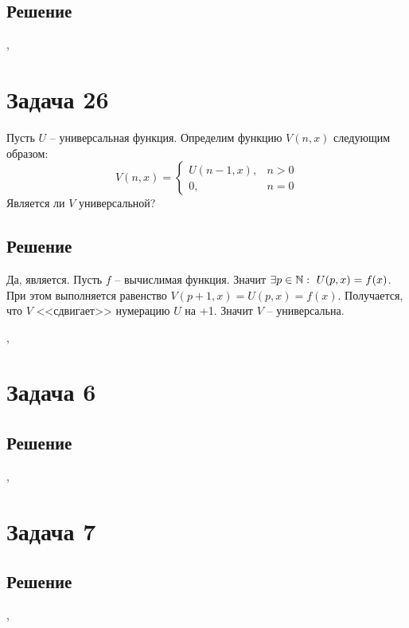 \documentclass[a4paper,12pt]{article}
\begin{document}
	\subsection*{Решение}


	\sep	
	
	\section*{Задача 26}
	Пусть $U$ -- универсальная функция. Определим функцию $V(n,x)$ следующим образом:
    \[
    V(n, x) = 
    \begin{cases}
        U(n - 1, x), & n > 0 \\
        0,           & n = 0
    \end{cases}
    \]
    Является ли $V$ универсальной?
    
	\subsection*{Решение}
	Да, является. Пусть $f$ -- вычислимая функция. Значит $\exists p \in \mathbb{N}: \ U(p, x) = f(x)$. При этом выполняется равенство $V(p + 1, x) = U(p, x) = f(x)$. Получается, что $V$ <<сдвигает>> нумерацию $U$ на +1. Значит $V$ -- универсальна.
	

	\sep	
		
		
	\section*{Задача 6}

	
	\subsection*{Решение}
	


	\sep		
	
	
	
	
	\section*{Задача 7}

	
	\subsection*{Решение}
	


	\sep	
	
	
	
	
\end{document}

